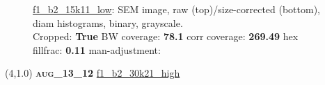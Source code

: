 \begin{figure}[h!]
\label{semimg13}
\caption*{\hyperlink{covtableaug_13_12}{\color{blue} \small \ttfamily f1\_b2\_15k11\_low}: SEM image, raw (top)/size-corrected (bottom), diam histograms, binary, grayscale.\\Cropped: {\bf True} \;\; BW coverage: {\bf 78.1} \:\: corr coverage: {\bf 269.49} \:\: hex fillfrac: {\bf 0.11} \:\: man-adjustment: {\bf \color{blue}{Yes}}}
\end{figure}
\newpage

\begin{textblock}{5}(4,1.0)
{\bf \textsc{aug\_13\_12}}
\hspace{4.5cm}
\hyperlink{covtableaug_13_12}{\color{blue} \large \ttfamily f1\_b2\_30k21\_high}
\end{textblock}

